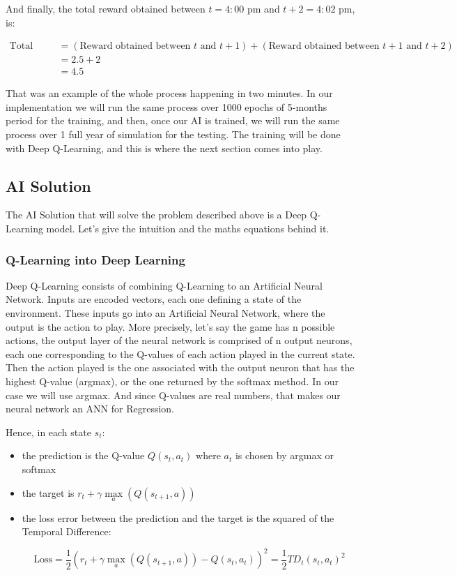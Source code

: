 \documentclass[]{book}
\begin{document}
And finally, the total reward obtained between \(t = 4:00\) pm and \(t+2 = 4:02\) pm, is:

\begin{align*}
    \textrm{Total Reward}
    & = (\textrm{Reward obtained between $t$ and $t+1$}) + (\textrm{Reward obtained between $t+1$ and $t+2$}) \\
    &  = 2.5 + 2 \\
    & = 4.5
\end{align*}

That was an example of the whole process happening in two minutes. In our implementation we will run the same process over 1000 epochs of 5-months period for the training, and then, once our AI is trained, we will run the same process over 1 full year of simulation for the testing. The training will be done with Deep Q-Learning, and this is where the next section comes into play.

\subsection{AI Solution}

The AI Solution that will solve the problem described above is a Deep Q-Learning model. Let's give the intuition and the maths equations behind it.

\subsubsection{Q-Learning into Deep Learning}

Deep Q-Learning consists of combining Q-Learning to an Artificial Neural Network. Inputs are encoded vectors, each one defining a state of the environment. These inputs go into an Artificial Neural Network, where the output is the action to play. More precisely, let's say the game has n possible actions, the output layer of the neural network is comprised of n output neurons, each one corresponding to the Q-values of each action played in the current state. Then the action played is the one associated with the output neuron that has the highest Q-value (argmax), or the one returned by the softmax method. In our case we will use argmax. And since Q-values are real numbers, that makes our neural network an ANN for Regression.

Hence, in each state \(s_t\):

\begin{itemize}

\item the prediction is the Q-value $Q(s_t, a_t)$ where $a_t$ is chosen by argmax or softmax
\item the target is $r_t + \gamma \underset{a}{\max}(Q(s_{t+1}, a))$
\item the loss error between the prediction and the target is the squared of the Temporal Difference:

\begin{equation*}
\textrm{Loss} = \frac{1}{2} \left( r_t + \gamma \underset{a}{\max}(Q(s_{t+1}, a)) - Q(s_t, a_t) \right)^2 = \frac{1}{2} TD_t(s_t, a_t)^2
\end{equation*}

\end{itemize}
\end{document}
